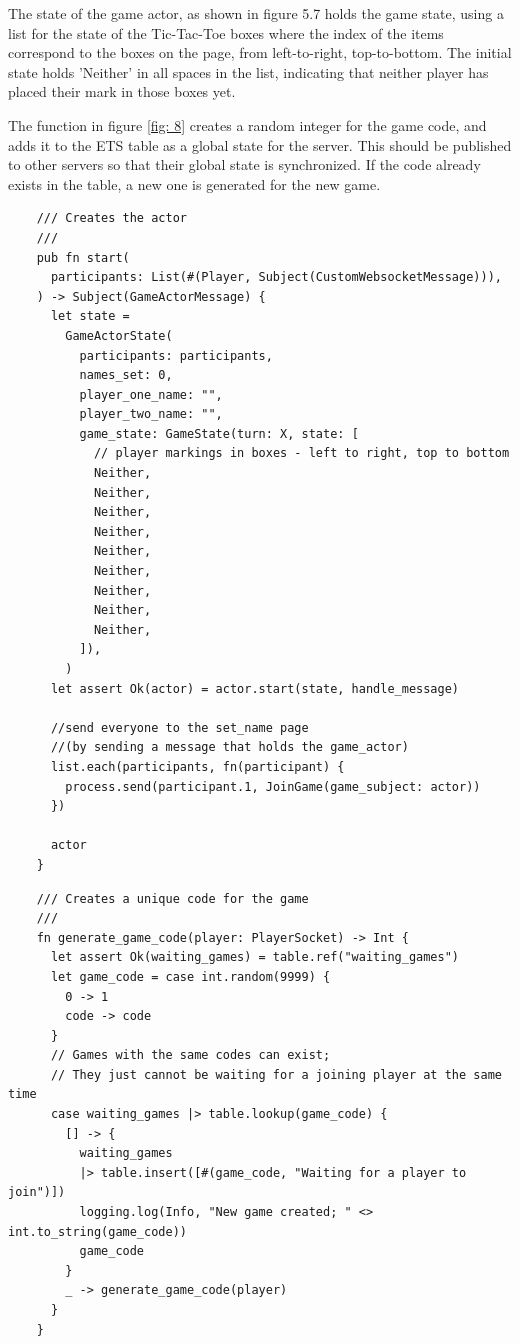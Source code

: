 \documentclass[]{final}
\begin{document}
\begin{minipage}[t]{18em}
  The state of the game actor, as shown in figure 5.7
  holds the game state, using a list for the state of the Tic-Tac-Toe boxes
  where the index of the items correspond to the boxes on the page, from
  left-to-right, top-to-bottom. The initial state holds 'Neither' in
  all spaces in the list, indicating that neither player has placed
  their mark in those boxes yet.

  \vspace*{28em}

  The function in figure \ref{fig: 8} creates a random integer for the game code,
  and adds it to the ETS table as a global state for the server. This should be
  published to other servers so that their global state is synchronized. If the
  code already exists in the table, a new one is generated for the new game.
\end{minipage}
\hfill
\begin{minipage}[t]{20em}
  \begin{lstlisting}
    /// Creates the actor
    ///
    pub fn start(
      participants: List(#(Player, Subject(CustomWebsocketMessage))),
    ) -> Subject(GameActorMessage) {
      let state =
        GameActorState(
          participants: participants,
          names_set: 0,
          player_one_name: "",
          player_two_name: "",
          game_state: GameState(turn: X, state: [
            // player markings in boxes - left to right, top to bottom
            Neither,
            Neither,
            Neither,
            Neither,
            Neither,
            Neither,
            Neither,
            Neither,
            Neither,
          ]),
        )
      let assert Ok(actor) = actor.start(state, handle_message)

      //send everyone to the set_name page
      //(by sending a message that holds the game_actor)
      list.each(participants, fn(participant) {
        process.send(participant.1, JoinGame(game_subject: actor))
      })

      actor
    }
  \end{lstlisting}
  \label{fig: 7}
  \vspace*{1.5cm}
  \begin{lstlisting}
    /// Creates a unique code for the game
    ///
    fn generate_game_code(player: PlayerSocket) -> Int {
      let assert Ok(waiting_games) = table.ref("waiting_games")
      let game_code = case int.random(9999) {
        0 -> 1
        code -> code
      }
      // Games with the same codes can exist;
      // They just cannot be waiting for a joining player at the same time
      case waiting_games |> table.lookup(game_code) {
        [] -> {
          waiting_games
          |> table.insert([#(game_code, "Waiting for a player to join")])
          logging.log(Info, "New game created; " <> int.to_string(game_code))
          game_code
        }
        _ -> generate_game_code(player)
      }
    }
  \end{lstlisting}
  \label{fig: 8}
\end{minipage}
\end{document}
